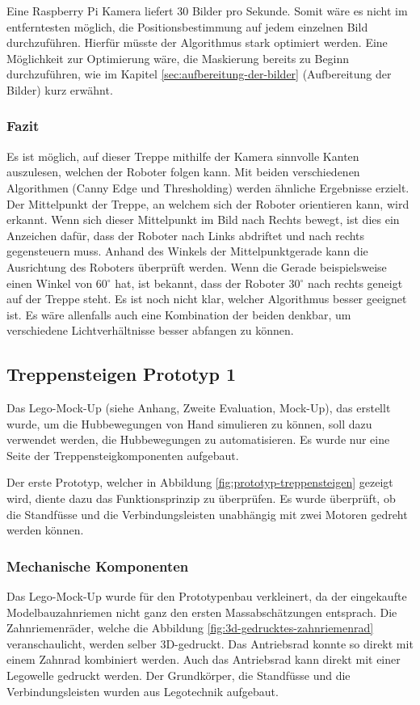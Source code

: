 Eine Raspberry Pi Kamera liefert 30 Bilder pro Sekunde. Somit wäre es nicht im entferntesten möglich, die Positionsbestimmung auf jedem einzelnen Bild durchzuführen. Hierfür müsste der Algorithmus stark optimiert werden. Eine Möglichkeit zur Optimierung wäre, die Maskierung bereits zu Beginn durchzuführen, wie im Kapitel \ref{sec:aufbereitung-der-bilder} (Aufbereitung der Bilder) kurz erwähnt.
  
\subsubsection{Fazit}
Es ist möglich, auf dieser Treppe mithilfe der Kamera sinnvolle Kanten auszulesen, welchen der Roboter folgen kann. Mit beiden verschiedenen Algorithmen (Canny Edge und Thresholding) werden ähnliche Ergebnisse erzielt. Der Mittelpunkt der Treppe, an welchem sich der Roboter orientieren kann, wird erkannt. Wenn sich dieser Mittelpunkt im Bild nach Rechts bewegt, ist dies ein Anzeichen dafür, dass der Roboter nach Links abdriftet und nach rechts gegensteuern muss. Anhand des Winkels der Mittelpunktgerade kann die Ausrichtung des Roboters überprüft werden. Wenn die Gerade beispielsweise einen Winkel von 60$^\circ$
 hat, ist bekannt, dass der Roboter 30$^\circ$ nach rechts geneigt auf der Treppe steht.
Es ist noch nicht klar, welcher Algorithmus besser geeignet ist. Es wäre allenfalls auch eine Kombination der beiden denkbar, um verschiedene Lichtverhältnisse besser abfangen zu können.

\newpage
\subsection{Treppensteigen Prototyp 1}
Das Lego-Mock-Up (siehe Anhang, Zweite Evaluation, Mock-Up), das erstellt wurde, um die Hubbewegungen von Hand simulieren zu können, soll dazu verwendet werden, die Hubbewegungen zu automatisieren. Es wurde nur eine Seite der Treppensteigkomponenten aufgebaut. 

Der erste Prototyp, welcher in Abbildung \ref{fig:prototyp-treppensteigen} gezeigt wird, diente dazu das Funktionsprinzip zu überprüfen. Es wurde überprüft, ob die Standfüsse und die Verbindungsleisten unabhängig mit zwei Motoren gedreht werden können. 

\subsubsection{Mechanische Komponenten}
Das Lego-Mock-Up wurde für den Prototypenbau verkleinert, da der eingekaufte Modelbauzahnriemen nicht ganz den ersten Massabschätzungen entsprach. Die Zahnriemenräder, welche die Abbildung \ref{fig:3d-gedrucktes-zahnriemenrad} veranschaulicht, werden selber 3D-gedruckt. Das Antriebsrad konnte so direkt mit einem Zahnrad kombiniert werden. Auch das Antriebsrad kann direkt mit einer Legowelle gedruckt werden. Der Grundkörper, die Standfüsse und die Verbindungsleisten wurden aus Legotechnik aufgebaut.\\

